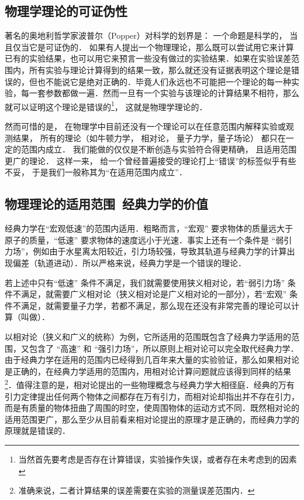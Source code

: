 
\subsection{物理学理论的可证伪性}

著名的奥地利哲学家波普尔（Popper）对科学的划界是： 一个命题是科学的， 当且仅当它是可证伪的． 如果有人提出一个物理理论，那么既可以尝试用它来计算已有的实验结果，也可以用它来预言一些没有做过的实验结果．如果在实验误差范围内，所有实验与理论计算得到的结果一致，那么就还没有证据表明这个理论是错误的，但也不能说它是绝对正确的．毕竟人们永远也不可能把一个理论的每一种实验，每一套参数都做一遍．然而一旦有一个实验与该理论的计算结果不相符，那么就可以证明这个理论是错误的\footnote{当然首先要考虑是否存在计算错误，实验操作失误，或者存在未考虑到的因素}， 这就是物理学理论的．

然而可惜的是， 在物理学中目前还没有一个理论可以在任意范围内解释实验或观测结果， 所有的理论（如牛顿力学， 相对论， 量子力学，量子场论） 都只在一定的范围内成立． 我们能做的仅仅是不断创造与实验符合得更精确， 且适用范围更广的理论． 这样一来， 给一个曾经普遍接受的理论打上“错误”的标签似乎有些不妥， 于是我们一般称其为“在适用范围内成立”．


\subsection{物理理论的适用范围\ 经典力学的价值}

经典力学在“宏观低速”的范围内适用．粗略而言，“宏观” 要求物体的质量远大于原子的质量，“低速” 要求物体的速度远小于光速．事实上还有一个条件是 “弱引力场”，例如由于水星离太阳较近，引力场较强，导致其轨道与经典力学的计算出现偏差（轨道进动）．所以严格来说，经典力学是一个错误的理论．

若上述中只有“低速” 条件不满足，我们就需要使用狭义相对论，若“弱引力场” 条件不满足，就需要广义相对论（狭义相对论是广义相对论的一部分），若“宏观” 条件不满足，就需要量子力学，若都不满足，那么现在还没有非常完善的理论可以计算（叫做）．

以相对论（狭义和广义的统称）为例，它所适用的范围既包含了经典力学适用的范围，又包含了 “高速” 和 “强引力场”，所以原则上相对论可以完全取代经典力学．由于经典力学在适用的范围内已经得到几百年来大量的实验验证，那么如果相对论是正确的，在经典力学适用的范围内，用相对论计算问题就应该得到同样的结果\footnote{准确来说，二者计算结果的误差需要在实验的测量误差范围内．}．值得注意的是，相对论提出的一些物理概念与经典力学大相径庭．经典的万有引力定律提出任何两个物体之间都存在万有引力，而相对论却指出并不存在引力，而是有质量的物体扭曲了周围的时空，使周围物体的运动方式不同．既然相对论的适用范围更广，那么至少从目前看来相对论提出的原理才是正确的，而经典力学的原理就是错误的． 

